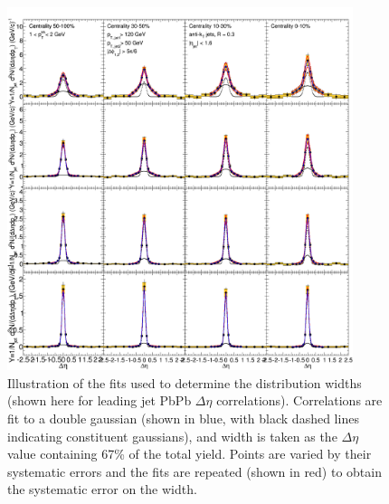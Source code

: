 \begin{figure}[h!]
\begin{center}

\includegraphics[width=0.9\textwidth]{figures/Appendices/Width_Check_Fits_Eta_PbPb_Leading.png}

\caption[Width determination for PbPb leading jets]{Illustration of the fits used to determine the distribution widths (shown here for leading jet PbPb $\Delta\eta$ correlations).  Correlations are fit to a double gaussian (shown in blue, with black dashed lines indicating constituent gaussians), and width is taken as the $\Delta\eta$ value containing 67\% of the total yield. Points are varied by their systematic errors and the fits are repeated (shown in red) to obtain the systematic error on the width.}
\label{fig:Width_check_fit_PbPb_lead}
\end{center}
\end{figure}



